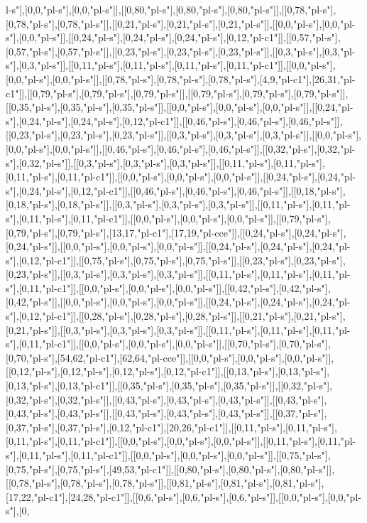 l-s"],[0,0,"pl-s"],[0,0,"pl-s"]],[[0,80,"pl-s"],[0,80,"pl-s"],[0,80,"pl-s"]],[[0,78,"pl-s"],[0,78,"pl-s"],[0,78,"pl-s"]],[[0,21,"pl-s"],[0,21,"pl-s"],[0,21,"pl-s"]],[[0,0,"pl-s"],[0,0,"pl-s"],[0,0,"pl-s"]],[[0,24,"pl-s"],[0,24,"pl-s"],[0,24,"pl-s"],[0,12,"pl-c1"]],[[0,57,"pl-s"],[0,57,"pl-s"],[0,57,"pl-s"]],[[0,23,"pl-s"],[0,23,"pl-s"],[0,23,"pl-s"]],[[0,3,"pl-s"],[0,3,"pl-s"],[0,3,"pl-s"]],[[0,11,"pl-s"],[0,11,"pl-s"],[0,11,"pl-s"],[0,11,"pl-c1"]],[[0,0,"pl-s"],[0,0,"pl-s"],[0,0,"pl-s"]],[[0,78,"pl-s"],[0,78,"pl-s"],[0,78,"pl-s"],[4,9,"pl-c1"],[26,31,"pl-c1"]],[[0,79,"pl-s"],[0,79,"pl-s"],[0,79,"pl-s"]],[[0,79,"pl-s"],[0,79,"pl-s"],[0,79,"pl-s"]],[[0,35,"pl-s"],[0,35,"pl-s"],[0,35,"pl-s"]],[[0,0,"pl-s"],[0,0,"pl-s"],[0,0,"pl-s"]],[[0,24,"pl-s"],[0,24,"pl-s"],[0,24,"pl-s"],[0,12,"pl-c1"]],[[0,46,"pl-s"],[0,46,"pl-s"],[0,46,"pl-s"]],[[0,23,"pl-s"],[0,23,"pl-s"],[0,23,"pl-s"]],[[0,3,"pl-s"],[0,3,"pl-s"],[0,3,"pl-s"]],[[0,0,"pl-s"],[0,0,"pl-s"],[0,0,"pl-s"]],[[0,46,"pl-s"],[0,46,"pl-s"],[0,46,"pl-s"]],[[0,32,"pl-s"],[0,32,"pl-s"],[0,32,"pl-s"]],[[0,3,"pl-s"],[0,3,"pl-s"],[0,3,"pl-s"]],[[0,11,"pl-s"],[0,11,"pl-s"],[0,11,"pl-s"],[0,11,"pl-c1"]],[[0,0,"pl-s"],[0,0,"pl-s"],[0,0,"pl-s"]],[[0,24,"pl-s"],[0,24,"pl-s"],[0,24,"pl-s"],[0,12,"pl-c1"]],[[0,46,"pl-s"],[0,46,"pl-s"],[0,46,"pl-s"]],[[0,18,"pl-s"],[0,18,"pl-s"],[0,18,"pl-s"]],[[0,3,"pl-s"],[0,3,"pl-s"],[0,3,"pl-s"]],[[0,11,"pl-s"],[0,11,"pl-s"],[0,11,"pl-s"],[0,11,"pl-c1"]],[[0,0,"pl-s"],[0,0,"pl-s"],[0,0,"pl-s"]],[[0,79,"pl-s"],[0,79,"pl-s"],[0,79,"pl-s"],[13,17,"pl-c1"],[17,19,"pl-cce"]],[[0,24,"pl-s"],[0,24,"pl-s"],[0,24,"pl-s"]],[[0,0,"pl-s"],[0,0,"pl-s"],[0,0,"pl-s"]],[[0,24,"pl-s"],[0,24,"pl-s"],[0,24,"pl-s"],[0,12,"pl-c1"]],[[0,75,"pl-s"],[0,75,"pl-s"],[0,75,"pl-s"]],[[0,23,"pl-s"],[0,23,"pl-s"],[0,23,"pl-s"]],[[0,3,"pl-s"],[0,3,"pl-s"],[0,3,"pl-s"]],[[0,11,"pl-s"],[0,11,"pl-s"],[0,11,"pl-s"],[0,11,"pl-c1"]],[[0,0,"pl-s"],[0,0,"pl-s"],[0,0,"pl-s"]],[[0,42,"pl-s"],[0,42,"pl-s"],[0,42,"pl-s"]],[[0,0,"pl-s"],[0,0,"pl-s"],[0,0,"pl-s"]],[[0,24,"pl-s"],[0,24,"pl-s"],[0,24,"pl-s"],[0,12,"pl-c1"]],[[0,28,"pl-s"],[0,28,"pl-s"],[0,28,"pl-s"]],[[0,21,"pl-s"],[0,21,"pl-s"],[0,21,"pl-s"]],[[0,3,"pl-s"],[0,3,"pl-s"],[0,3,"pl-s"]],[[0,11,"pl-s"],[0,11,"pl-s"],[0,11,"pl-s"],[0,11,"pl-c1"]],[[0,0,"pl-s"],[0,0,"pl-s"],[0,0,"pl-s"]],[[0,70,"pl-s"],[0,70,"pl-s"],[0,70,"pl-s"],[54,62,"pl-c1"],[62,64,"pl-cce"]],[[0,0,"pl-s"],[0,0,"pl-s"],[0,0,"pl-s"]],[[0,12,"pl-s"],[0,12,"pl-s"],[0,12,"pl-s"],[0,12,"pl-c1"]],[[0,13,"pl-s"],[0,13,"pl-s"],[0,13,"pl-s"],[0,13,"pl-c1"]],[[0,35,"pl-s"],[0,35,"pl-s"],[0,35,"pl-s"]],[[0,32,"pl-s"],[0,32,"pl-s"],[0,32,"pl-s"]],[[0,43,"pl-s"],[0,43,"pl-s"],[0,43,"pl-s"]],[[0,43,"pl-s"],[0,43,"pl-s"],[0,43,"pl-s"]],[[0,43,"pl-s"],[0,43,"pl-s"],[0,43,"pl-s"]],[[0,37,"pl-s"],[0,37,"pl-s"],[0,37,"pl-s"],[0,12,"pl-c1"],[20,26,"pl-c1"]],[[0,11,"pl-s"],[0,11,"pl-s"],[0,11,"pl-s"],[0,11,"pl-c1"]],[[0,0,"pl-s"],[0,0,"pl-s"],[0,0,"pl-s"]],[[0,11,"pl-s"],[0,11,"pl-s"],[0,11,"pl-s"],[0,11,"pl-c1"]],[[0,0,"pl-s"],[0,0,"pl-s"],[0,0,"pl-s"]],[[0,75,"pl-s"],[0,75,"pl-s"],[0,75,"pl-s"],[49,53,"pl-c1"]],[[0,80,"pl-s"],[0,80,"pl-s"],[0,80,"pl-s"]],[[0,78,"pl-s"],[0,78,"pl-s"],[0,78,"pl-s"]],[[0,81,"pl-s"],[0,81,"pl-s"],[0,81,"pl-s"],[17,22,"pl-c1"],[24,28,"pl-c1"]],[[0,6,"pl-s"],[0,6,"pl-s"],[0,6,"pl-s"]],[[0,0,"pl-s"],[0,0,"pl-s"],[0,